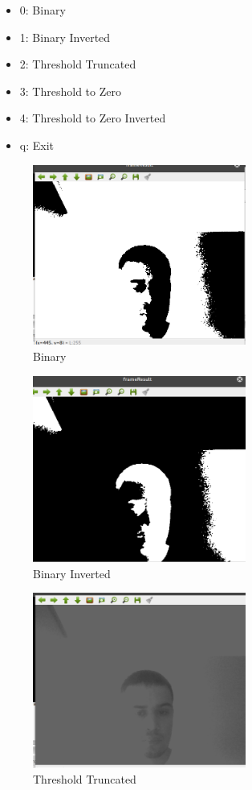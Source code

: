 \documentclass[portuguese, times, mirror]{revdetua}
\begin{document}
\begin{itemize}
\item 0: Binary
\item 1: Binary Inverted
\item 2: Threshold Truncated
\item 3: Threshold to Zero
\item 4: Threshold to Zero Inverted
\item q: Exit
\end{itemize}



\begin{figure}[ht!]
\centering
\includegraphics[width=70mm]{img/2_1.png}
\caption{Binary}
\end{figure}

\begin{figure}[ht!]
\centering
\includegraphics[width=70mm]{img/2_2.png}
\caption{Binary Inverted}
\end{figure}

\begin{figure}[ht!]
\centering
\includegraphics[width=70mm]{img/2_3.png}
\caption{Threshold Truncated}
\end{figure}
\end{document}
